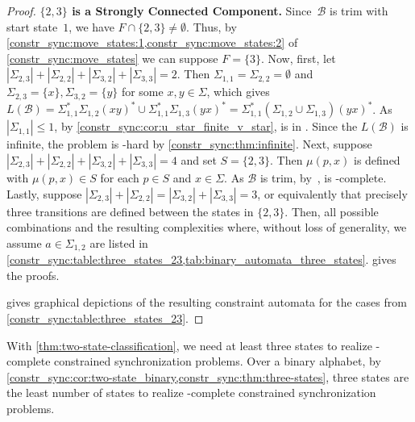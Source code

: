 \begin{proof}
\medskip
\noindent\textbf{\texorpdfstring{$\{2,3\}$}{{2,3}} is a Strongly Connected Component.} 
Since~$\mathcal B$ is trim with start state~$1$, we have $F \cap \{2,3\} \ne \emptyset$.
Thus, by \cref{constr_sync:move_states:1,constr_sync:move_states:2} of \cref{constr_sync:move_states} 
we can suppose $F = \{3\}$.
Now, first, let $|\Sigma_{2,3}| + |\Sigma_{2,2}| + |\Sigma_{3,2}| + |\Sigma_{3,3}| = 2$.
Then $\Sigma_{1,1}=\Sigma_{2,2}=\emptyset$
and $\Sigma_{2,3}=\{x\}, \Sigma_{3,2}=\{y\}$ for some $x,y \in \Sigma$,
which gives
$L(\mathcal B) = \Sigma_{1,1}^* \Sigma_{1,2} (xy)^* \cup \Sigma_{1,1}^*\Sigma_{1,3} (yx)^* = \Sigma_{1,1}^* ( \Sigma_{1,2} \cup \Sigma_{1,3} ) (yx)^*$.
As $|\Sigma_{1,1}| \le 1$, by \cref{constr_sync:cor:u_star_finite_v_star},
 is in \LOGSPACE.
Since the $L(\mathcal B)$ is infinite,
the problem is \LOGSPACE-hard 
by \cref{constr_sync:thm:infinite}.
Next, suppose $|\Sigma_{2,3}| + |\Sigma_{2,2}| + |\Sigma_{3,2}| + |\Sigma_{3,3}| = 4$ and set $S = \{2,3\}$.
Then $\mu(p, x)$ is defined with $\mu(p, x) \in S$ for each $p \in S$
and $x \in \Sigma$.
As $\mathcal B$ is trim, by~,
 is \NL-complete.
Lastly, suppose 
$|\Sigma_{2,3}| + |\Sigma_{2,2}| = |\Sigma_{3,2}| + |\Sigma_{3,3}| = 3$, or equivalently
that precisely three transitions are defined between the states in $\{2,3\}$.
Then, all possible combinations and the resulting complexities
where, without loss of generality, we assume $a \in \Sigma_{1,2}$
are listed in \cref{constr_sync:table:three_states_23,tab:binary_automata_three_states}. 
gives the proofs. 




gives graphical depictions of the resulting constraint automata
for the cases from \cref{constr_sync:table:three_states_23}.
\end{proof}

With \cref{thm:two-state-classification}, we need at least three states
to realize \NP-complete constrained synchronization problems.
Over a binary alphabet, 
by \cref{constr_sync:cor:two-state_binary,constr_sync:thm:three-states},
three states are the least number of states to realize \PSPACE-complete
constrained synchronization problems. 

